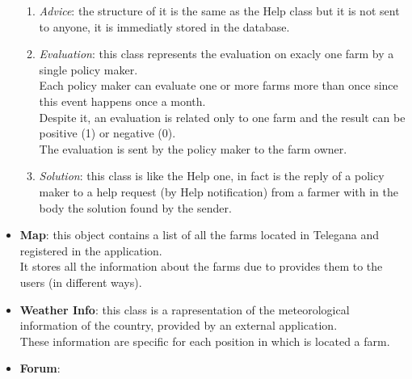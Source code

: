 \begin{itemize}
\begin{enumerate}
            \item \textsl{Advice}: the structure of it is the same as the Help class but it is not sent to anyone,
             it is immediatly stored in the database.
            \item \textsl{Evaluation}: this class represents the evaluation on exacly one farm by a single policy maker.\\ Each policy maker can evaluate one or more 
            farms more than once since this event happens once a month.\\ Despite it, an evaluation is related only to one farm and the result can be positive (1) or negative (0).\\ The evaluation is sent by the policy maker to the farm owner.
            \item \textsl{Solution}: this class is like the Help one, in fact is the reply of a policy maker to a help request (by Help notification) from a farmer with in the body the solution found by the sender.
        \end{enumerate}
    
    \item \textbf{Map}: this object contains a list of all the farms located in Telegana and registered in the application.\\It stores all the information about the farms due to provides them to the users (in different ways).
    \item \textbf{Weather Info}: this class is a rapresentation of the meteorological information of the country, provided by an external application.\\These information are specific for each position in which is located a farm.
    
    \item \textbf{Forum}:
    
\end{itemize}
